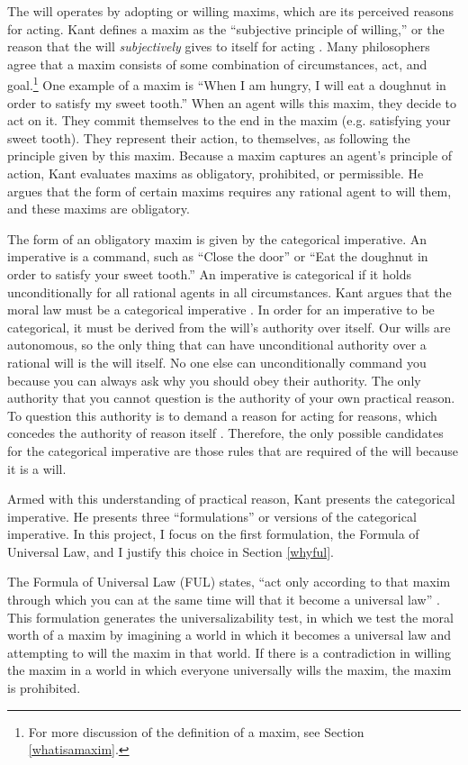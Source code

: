 \begin{isabellebody}
\begin{isamarkuptext}
The will operates by adopting or willing maxims, which are its perceived reasons for acting. Kant defines a maxim as 
the ``subjective principle of willing,'' or the reason that the will \emph{subjectively} gives 
to itself for acting \citep[16, footnote 1]{groundwork}. Many philosophers agree that a maxim consists 
of some combination of circumstances, 
act, and goal.\footnote{For more discussion of the definition of a maxim, see Section \ref{whatisamaxim}.}
One example of a maxim is ``When I am hungry, I will eat a doughnut in order to satisfy my sweet tooth.''
When an agent wills this maxim, they decide to act on it. They commit themselves to the end in the maxim 
(e.g. satisfying your sweet tooth). They represent their action, to themselves, as following the 
principle given by this maxim. Because a maxim captures an agent's principle of action, Kant evaluates
maxims as obligatory, prohibited, or permissible. He argues that the form of certain maxims 
requires any rational agent to will them, and these maxims are obligatory. 

The form of an obligatory maxim is given by the categorical imperative. 
An imperative is a command, such as ``Close the door'' or ``Eat the doughnut in order to satisfy your 
sweet tooth.'' An imperative is categorical if it holds unconditionally for all rational agents in all 
circumstances. Kant argues that the moral law must be a categorical imperative \citep[5]{groundwork}. 
In order for an imperative to be categorical, it must be derived from the will's authority over itself. 
Our wills are autonomous, so the only thing that can have unconditional authority over a rational will is 
the will itself. No one else can unconditionally command you because you can always ask why you 
should obey their authority. The only authority that you cannot question is the authority of your own 
practical reason. To question this authority is to demand a reason for acting for reasons, which 
concedes the authority of reason itself \citep[23]{velleman}. Therefore, the only possible candidates 
for the categorical imperative are those rules that are required of the will because it is a will. 

Armed with this understanding of practical reason, Kant presents the categorical 
imperative. He presents three ``formulations'' or versions of the categorical imperative. In this project, 
I focus on the first formulation, the Formula of Universal Law, and I justify this choice in Section \ref{whyful}.

The Formula of Universal Law (FUL) states, ``act only according to that maxim through which you can 
at the same time will that it become a universal law'' \cite[34]{groundwork}. This formulation
generates the universalizability test, in which we test the moral worth of a maxim by 
imagining a world in which it becomes a universal law and attempting to will the maxim in that world.
If there is a contradiction in willing the maxim in a world in which everyone universally wills the maxim,
the maxim is prohibited. 


\end{isamarkuptext}
\end{isabellebody}
